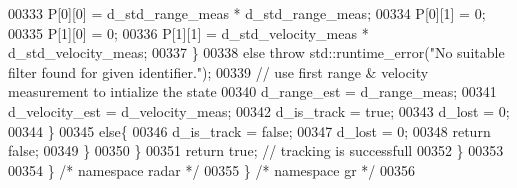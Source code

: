 \begin{DoxyCode}
00333                     P[0][0] = d_std_range_meas * d_std_range_meas;
00334                     P[0][1] = 0;
00335                     P[1][0] = 0;
00336                     P[1][1] = d_std_velocity_meas * d_std_velocity_meas;
00337                 \}
00338                 \textcolor{keywordflow}{else} \textcolor{keywordflow}{throw} std::runtime\_error(\textcolor{stringliteral}{"No suitable filter found for given identifier."});                    
00339                 \textcolor{comment}{// use first range & velocity measurement to intialize the state}
00340                 d_range_est = d_range_meas;
00341                 d_velocity_est = d_velocity_meas;
00342                 d_is_track = \textcolor{keyword}{true};
00343                 d_lost = 0;
00344             \}
00345             \textcolor{keywordflow}{else}\{
00346                 d_is_track = \textcolor{keyword}{false};
00347                 d_lost = 0;
00348                 \textcolor{keywordflow}{return} \textcolor{keyword}{false};
00349             \}
00350         \}
00351         \textcolor{keywordflow}{return} \textcolor{keyword}{true}; \textcolor{comment}{// tracking is successfull}
00352     \}
00353 
00354   \} \textcolor{comment}{/* namespace radar */}
00355 \} \textcolor{comment}{/* namespace gr */}
00356 
\end{DoxyCode}
